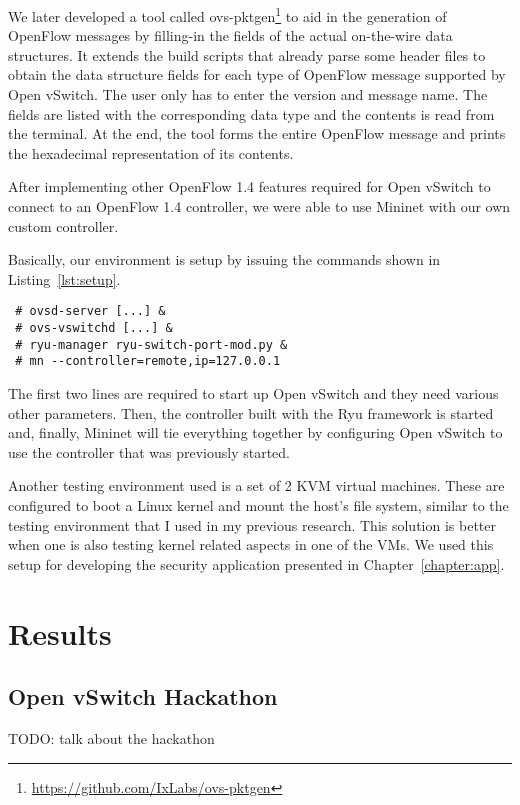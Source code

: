 We later developed a tool called ovs-pktgen\footnote{\url{https://github.com/IxLabs/ovs-pktgen}}
to aid in the generation of OpenFlow messages by filling-in the fields of the actual on-the-wire
data structures. It extends the build scripts that already parse some header files to obtain the
data structure fields for each type of OpenFlow message supported by Open vSwitch. The user only
has to enter the version and message name. The fields are listed with the corresponding data type
and the contents is read from the terminal. At the end, the tool forms the entire OpenFlow message
and prints the hexadecimal representation of its contents.

After implementing other OpenFlow 1.4 features required for Open vSwitch to connect
to an OpenFlow 1.4 controller, we were able to use Mininet with our own custom controller.

Basically, our environment is setup by issuing the commands shown in Listing~\ref{lst:setup}.
\lstset{caption=Setting up the Development Environment,label=lst:setup}
\begin{lstlisting}
 # ovsd-server [...] &
 # ovs-vswitchd [...] &
 # ryu-manager ryu-switch-port-mod.py &
 # mn --controller=remote,ip=127.0.0.1
\end{lstlisting}
The first two lines are required to start up Open vSwitch and they need various other parameters.
Then, the controller built with the Ryu framework is started and, finally, Mininet will tie
everything together by configuring Open vSwitch to use the controller that was previously started.

Another testing environment used is a set of 2 KVM virtual machines. These are configured to
boot a Linux kernel and mount the host's file system, similar to the testing environment that
I used in my previous research. This solution is better when one is also testing kernel related
aspects in one of the VMs. We used this setup for developing the security application presented
in Chapter~\ref{chapter:app}.

\section{Results}

\subsection{Open vSwitch Hackathon}

TODO: talk about the hackathon

